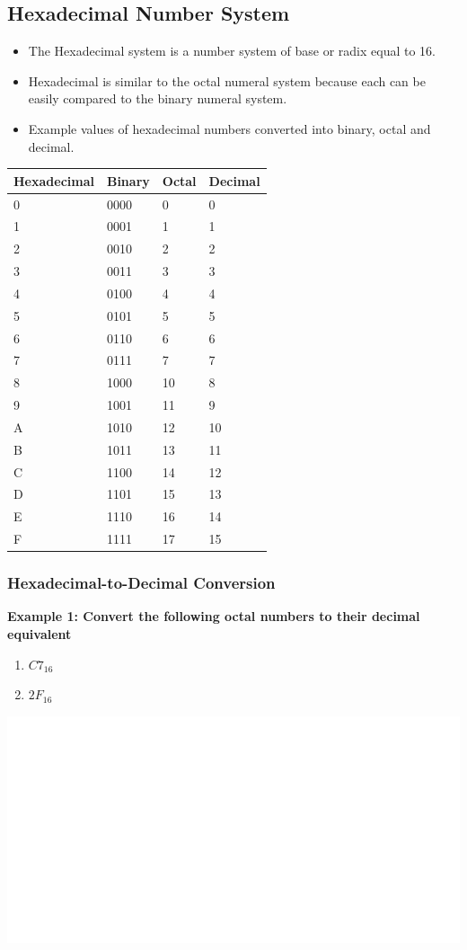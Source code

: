 \documentclass[]{book}
\providecommand{\tightlist}{%
  \setlength{\itemsep}{0pt}\setlength{\parskip}{0pt}}
\begin{document}
\hypertarget{hexadecimal-number-system}{%
\subsection{Hexadecimal Number System}\label{hexadecimal-number-system}}

\begin{itemize}
\tightlist
\item
  The Hexadecimal system is a number system of base or radix equal to 16.
\item
  Hexadecimal is similar to the octal numeral system because each can be easily compared to the binary numeral system.
\item
  Example values of hexadecimal numbers converted into binary, octal and decimal.
\end{itemize}

\begin{longtable}[]{@{}llll@{}}
\toprule
Hexadecimal & Binary & Octal & Decimal\tabularnewline
\midrule
\endhead
0 & 0000 & 0 & 0\tabularnewline
1 & 0001 & 1 & 1\tabularnewline
2 & 0010 & 2 & 2\tabularnewline
3 & 0011 & 3 & 3\tabularnewline
4 & 0100 & 4 & 4\tabularnewline
5 & 0101 & 5 & 5\tabularnewline
6 & 0110 & 6 & 6\tabularnewline
7 & 0111 & 7 & 7\tabularnewline
8 & 1000 & 10 & 8\tabularnewline
9 & 1001 & 11 & 9\tabularnewline
A & 1010 & 12 & 10\tabularnewline
B & 1011 & 13 & 11\tabularnewline
C & 1100 & 14 & 12\tabularnewline
D & 1101 & 15 & 13\tabularnewline
E & 1110 & 16 & 14\tabularnewline
F & 1111 & 17 & 15\tabularnewline
\bottomrule
\end{longtable}

\hypertarget{hexadecimal-to-decimal-conversion}{%
\subsubsection{Hexadecimal-to-Decimal Conversion}\label{hexadecimal-to-decimal-conversion}}

\textbf{Example 1: Convert the following octal numbers to their decimal equivalent}

\begin{enumerate}
\def\labelenumi{(\alph{enumi})}
\tightlist
\item
  \(C7_{16}\)
\item
  \(2F_{16}\)
\end{enumerate}

\begin{center}\includegraphics[width=1\linewidth]{figure/NSbox14-1} \end{center}
\end{document}
